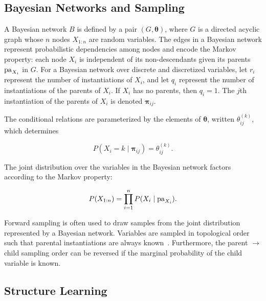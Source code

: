 \subsection{Bayesian Networks and Sampling}

A Bayesian network $B$ is defined by a pair $(G,\bm{\theta})$, where $G$ is a directed acyclic graph whose $n$ nodes $X_{1:n}$ are random variables.
The edges in a Bayesian network represent probabilistic dependencies among nodes and encode the Markov property: each node $X_i$ is independent of its non-descendants given its parents $\operatorname{pa}_{X_i}$ in $G$.
For a Bayesian network over discrete and discretized variables, let $r_i$ represent the number of instantiations of $X_i$, and let $q_i$ represent the number of instantiations of the parents of $X_i$.
If $X_i$ has no parents, then $q_i = 1$.
The $j$th instantiation of the parents of $X_i$ is denoted $\bm{\pi}_{ij}$.

The conditional relations are parameterized by the elements of $\bm{\theta}$, written $\theta_{ij}^{(k)}$, which determines

\begin{equation}
P(X_i = k \mid \bm{\pi}_{ij}) = \theta_{ij}^{(k)}\text{.}
\end{equation}

The joint distribution over the variables in the Bayesian network factors according to the Markov property:

\begin{equation}
P(X_{1:n}) = \prod_{i=1}^n P(X_i \mid \operatorname{pa}_{X_i})\text{.}
\end{equation}

Forward sampling is often used to draw samples from the joint distribution represented by a Bayesian network.
Variables are sampled in topological order such that parental instantiations are always known~\citep{algo_2009}.
Furthermore, the parent $\rightarrow$ child sampling order can be reversed if the marginal probability of the child variable is known.


\subsection{Structure Learning}


